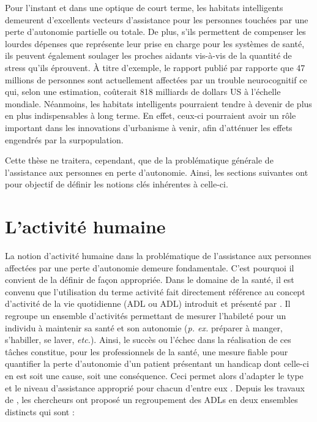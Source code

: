 Pour l'instant et dans une optique de court terme, les habitats intelligents demeurent d'excellents vecteurs d'assistance pour les personnes touchées par une perte d'autonomie partielle ou totale. De plus, s'ils permettent de compenser les lourdes dépenses que représente leur prise en charge pour les systèmes de santé, ils peuvent également soulager les proches aidants vis-à-vis de la quantité de stress qu'ils éprouvent. À titre d'exemple, le rapport publié par \cite{Prince2016} rapporte que 47 millions de personnes sont actuellement affectées par un trouble neurocognitif ce qui, selon une estimation, coûterait 818 milliards de dollars US à l'échelle mondiale. Néanmoins, les habitats intelligents pourraient tendre à devenir de plus en plus indispensables à long terme. En effet, ceux-ci pourraient avoir un rôle important dans les innovations d'urbanisme à venir, afin d'atténuer les effets engendrés par la surpopulation.

Cette thèse ne traitera, cependant, que de la problématique générale de l'assistance aux personnes en perte d'autonomie. Ainsi, les sections suivantes ont pour objectif de définir les notions clés inhérentes à celle-ci.

\section{L'activité humaine}

La notion d'activité humaine dans la problématique de l'assistance aux personnes affectées par une perte d'autonomie demeure fondamentale. C'est pourquoi il convient de la définir de façon appropriée. Dans le domaine de la santé, il est convenu que l'utilisation du terme activité fait directement référence au concept d'activité de la vie quotidienne (\acl{ADL} ou \acs{ADL}) introduit et présenté par \cite{Katz1963}. Il regroupe un ensemble d'activités permettant de mesurer l'habileté pour un individu à maintenir sa santé et son autonomie (\textit{p. ex.} préparer à manger, s'habiller, se laver, \textit{etc.}). Ainsi, le succès ou l'échec dans la réalisation de ces tâches constitue, pour les professionnels de la santé, une mesure fiable pour quantifier la perte d'autonomie d'un patient présentant un handicap dont celle-ci en est soit une cause, soit une conséquence. Ceci permet alors d'adapter le type et le niveau d'assistance approprié pour chacun d'entre eux \citep{Giovannetti2002}. Depuis les travaux de \cite{Katz1963}, les chercheurs \cite{Lawton1969} ont proposé un regroupement des \acsp{ADL} en deux ensembles distincts qui sont :

